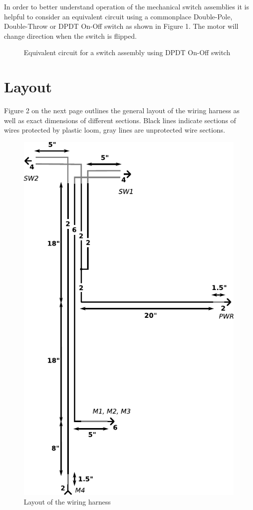 \documentclass[12pt,letterpaper]{article}
\begin{document}
In order to better understand operation of the mechanical switch assemblies it is helpful to consider an equivalent circuit using a commonplace Double-Pole, Double-Throw or DPDT On-Off switch as shown in Figure 1. The motor will change direction when the switch is flipped.
\begin{figure}[h]\label{fig:motorcontrol}
\centering
\def\svgscale{0.4}

\caption{Equivalent circuit for a switch assembly using DPDT On-Off switch}
\end{figure}

\section{Layout}
Figure 2 on the next page outlines the general layout of the wiring harness as well as exact dimensions of different sections. Black lines indicate sections of wires protected by plastic loom, gray lines are unprotected wire sections.

% 

\begin{figure}[h!]
  \centering
  \includegraphics[width=0.75\linewidth]{layout.pdf}
  \caption{Layout of the wiring harness}
  \label{fig:layout}
\end{figure}
\end{document}
